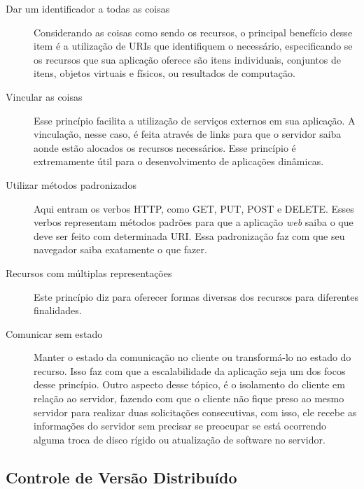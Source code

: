 \documentclass[
	12pt,				%
	oneside,			%
	a4paper,			%
	brazil				%
]{abntex2}
\begin{document}
\begin{description}

\item[Dar um identificador a todas as coisas]

 \- Considerando as coisas como sendo os recursos, o principal benefício desse item é a utilização de URIs que identifiquem o necessário, especificando se os recursos que sua aplicação oferece são itens individuais, conjuntos de itens, objetos virtuais e físicos, ou resultados de computação.  

\item[Vincular as coisas]

 \- Esse princípio facilita a utilização de serviços externos em sua aplicação. A vinculação, nesse caso, é feita através de links para que o servidor saiba aonde estão alocados os recursos necessários. Esse princípio é extremamente útil para o desenvolvimento de aplicações dinâmicas.

\item[Utilizar métodos padronizados]

 \- Aqui entram os verbos HTTP, como GET, PUT, POST e DELETE. Esses verbos representam métodos padrões para que a aplicação \textit{web} saiba o que deve ser feito com determinada URI. Essa padronização faz com que seu navegador saiba exatamente o que fazer.

\item[Recursos com múltiplas representações]

 \- Este princípio diz para oferecer formas diversas dos recursos para diferentes finalidades. 	

\item[Comunicar sem estado]

 \- Manter o estado da comunicação no cliente ou transformá-lo no estado do recurso. Isso faz com que a escalabilidade da aplicação seja um dos focos desse princípio. Outro aspecto desse tópico, é o isolamento do cliente em relação ao servidor, fazendo com que o cliente não fique preso ao mesmo servidor para realizar duas solicitações consecutivas, com isso, ele recebe as informações do servidor sem precisar se preocupar se está ocorrendo alguma troca de disco rígido ou atualização de software no servidor.

\end{description} 


\subsection{Controle de Versão Distribuído}
\end{document}
